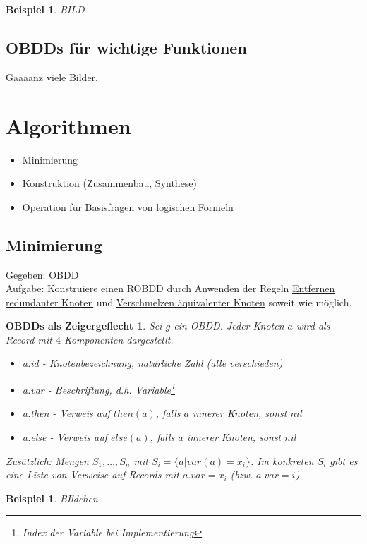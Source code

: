 \documentclass[ngerman]{scrartcl}
\theoremstyle{custom}
\newtheorem{mex}[mdef]{Beispiel}
\newtheorem{obdd}[mdef]{OBDDs als Zeigergeflecht}
\newcommand{\0}{\mathbf{0}}
\newcommand{\1}{\mathbf{L}}
\begin{document}
\begin{mex}
BILD
\end{mex}

\subsection{OBDDs f\"ur wichtige Funktionen}
Gaaaanz viele Bilder.

\newpage

\section{Algorithmen}
\begin{itemize}
\item Minimierung
\item Konstruktion (Zusammenbau, Synthese)
\item Operation f\"ur
Basisfragen von logischen Formeln
\end{itemize}

\subsection{Minimierung}
Gegeben: OBDD\\
Aufgabe: Konstruiere einen ROBDD durch Anwenden der Regeln
\hyperref[regel:entf]{\glqq Entfernen redundanter Knoten\grqq} und
\hyperref[regel:verschm]{\glqq Verschmelzen \"aquivalenter Knoten\grqq} soweit wie
  m\"oglich.

\begin{obdd}
Sei $g$ ein OBDD. Jeder Knoten $a$ wird als \emph{Record} mit $4$
Komponenten dargestellt.
\begin{itemize}
\item[(1)] a.id - Knotenbezeichnung, nat\"urliche Zahl (alle
  verschieden)
\item[(2)] a.var - Beschriftung, d.h. Variable\footnote{Index der
    Variable bei Implementierung}
\item[(3)] a.then - Verweis auf $then(a)$, falls $a$ innerer Knoten,
  sonst $nil$
\item[(4)] a.else - Verweis auf $else(a)$, falls $a$ innerer Knoten,
  sonst $nil$
\end{itemize}
Zus\"atzlich: Mengen $S_1,\dots,S_n$ mit $S_i=\{ a \vert
\underline{var}(a)=x_i\}$. Im konkreten $S_i$ gibt es eine Liste von
Verweise auf Records mit $a.var = x_i$ (bzw. $a.var = i$).
\end{obdd}

\begin{mex}
BIldchen
\end{mex}
\end{document}
